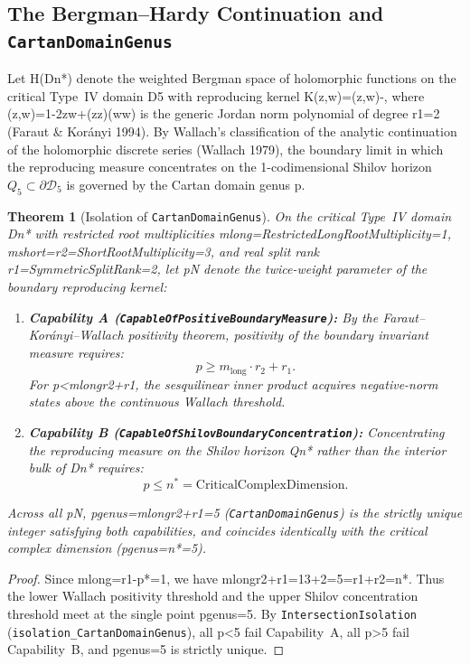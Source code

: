 \documentclass[11pt,reqno]{amsart}
\newtheorem{theorem}{Theorem}[section]
\theoremstyle{definition}
\theoremstyle{remark}
\begin{document}
\subsection{The Bergman--Hardy Continuation and \texttt{CartanDomainGenus}}

Let H(Dn*) denote the weighted Bergman space of holomorphic functions on the critical Type~IV domain D5 with reproducing kernel K(z,w)=(z,w)-, where (z,w)=1-2zw+(zz)(ww) is the generic Jordan norm polynomial of degree r1=2 (Faraut \& Kor\'anyi 1994). By Wallach's classification of the analytic continuation of the holomorphic discrete series (Wallach 1979), the boundary limit in which the reproducing measure concentrates on the 1-codimensional Shilov horizon $Q_5 \subset \partial\mathcal{D}_5$ is governed by the Cartan domain genus p.

\begin{theorem}[Isolation of \texttt{CartanDomainGenus}]
\label{thm:cartan_genus}
On the critical Type~IV domain Dn* with restricted root multiplicities mlong=RestrictedLongRootMultiplicity=1, mshort=r2=ShortRootMultiplicity=3, and real split rank r1=SymmetricSplitRank=2, let pN denote the twice-weight parameter of the boundary reproducing kernel:
\begin{enumerate}[label=(\alph*)]
  \item \textbf{Capability A (\texttt{CapableOfPositiveBoundaryMeasure}):} By the Faraut--Kor\'anyi--Wallach positivity theorem, positivity of the boundary invariant measure requires:
  \begin{equation}
    p \ge m_{\mathrm{long}} \cdot r_2 + r_1.
  \end{equation}
  For p<mlongr2+r1, the sesquilinear inner product acquires negative-norm states above the continuous Wallach threshold.
  \item \textbf{Capability B (\texttt{CapableOfShilovBoundaryConcentration}):} Concentrating the reproducing measure on the Shilov horizon Qn* rather than the interior bulk of Dn* requires:
  \begin{equation}
    p \le n^* = \mathrm{CriticalComplexDimension}.
  \end{equation}
\end{enumerate}
Across all pN, pgenus=mlongr2+r1=5 (\texttt{CartanDomainGenus}) is the strictly unique integer satisfying both capabilities, and coincides identically with the critical complex dimension (pgenus=n*=5).
\end{theorem}
\begin{proof}
Since mlong=r1-p*=1, we have mlongr2+r1=13+2=5=r1+r2=n*. Thus the lower Wallach positivity threshold and the upper Shilov concentration threshold meet at the single point pgenus=5. By \texttt{IntersectionIsolation} (\texttt{isolation\_CartanDomainGenus}), all p<5 fail Capability~A, all p>5 fail Capability~B, and pgenus=5 is strictly unique.
\end{proof}
\end{document}
